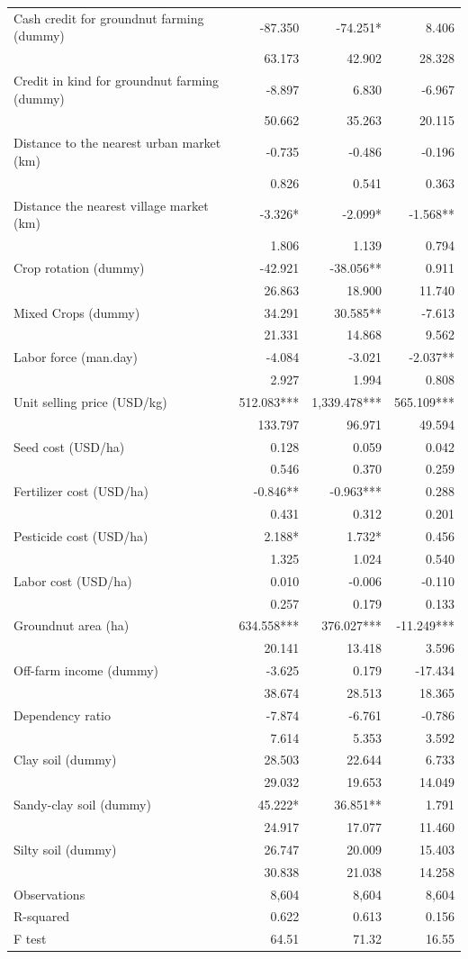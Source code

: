 \documentclass[
]{article}
\begin{document}
\begin{longtable}[t]{lrrr}
Cash credit for groundnut farming (dummy) & -87.350 & -74.251* & 8.406\\
 & 63.173 & 42.902 & 28.328\\
Credit in kind for groundnut farming (dummy) & -8.897 & 6.830 & -6.967\\
 & 50.662 & 35.263 & 20.115\\
Distance to the nearest urban market (km) & -0.735 & -0.486 & -0.196\\
 & 0.826 & 0.541 & 0.363\\
Distance the nearest village market (km) & -3.326* & -2.099* & -1.568**\\
 & 1.806 & 1.139 & 0.794\\
Crop rotation (dummy) & -42.921 & -38.056** & 0.911\\
 & 26.863 & 18.900 & 11.740\\
Mixed Crops (dummy) & 34.291 & 30.585** & -7.613\\
 & 21.331 & 14.868 & 9.562\\
Labor force (man.day) & -4.084 & -3.021 & -2.037**\\
 & 2.927 & 1.994 & 0.808\\
Unit selling price (USD/kg) & 512.083*** & 1,339.478*** & 565.109***\\
 & 133.797 & 96.971 & 49.594\\
Seed cost (USD/ha) & 0.128 & 0.059 & 0.042\\
 & 0.546 & 0.370 & 0.259\\
Fertilizer cost (USD/ha) & -0.846** & -0.963*** & 0.288\\
 & 0.431 & 0.312 & 0.201\\
Pesticide cost (USD/ha) & 2.188* & 1.732* & 0.456\\
 & 1.325 & 1.024 & 0.540\\
Labor cost (USD/ha) & 0.010 & -0.006 & -0.110\\
 & 0.257 & 0.179 & 0.133\\
Groundnut area (ha) & 634.558*** & 376.027*** & -11.249***\\
 & 20.141 & 13.418 & 3.596\\
Off-farm income (dummy) & -3.625 & 0.179 & -17.434\\
 & 38.674 & 28.513 & 18.365\\
Dependency ratio & -7.874 & -6.761 & -0.786\\
 & 7.614 & 5.353 & 3.592\\
Clay soil (dummy) & 28.503 & 22.644 & 6.733\\
 & 29.032 & 19.653 & 14.049\\
Sandy-clay soil (dummy) & 45.222* & 36.851** & 1.791\\
 & 24.917 & 17.077 & 11.460\\
Silty soil (dummy) & 26.747 & 20.009 & 15.403\\
 & 30.838 & 21.038 & 14.258\\
Observations & 8,604 & 8,604 & 8,604\\
R-squared & 0.622 & 0.613 & 0.156\\
F test & 64.51 & 71.32 & 16.55\\*
\end{longtable}
\endgroup{}
\newpage
\end{document}
